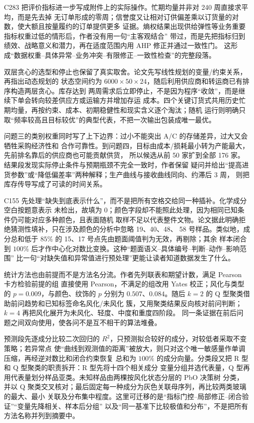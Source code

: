 \documentclass[UTF8,a4paper,12pt]{ctexart}
\begin{document}
C283 把评价指标进一步写成附件上的实际操作。忙期均量并非对 240 周直接求平均，而是先去掉
无订单形成的零周；信誉度又让相对订供偏差乘以订货量的对数，使大额且按量履约的订单提供更多
证据。熵权结果出现供给弹性等业务重要指标权重过低的情形后，作者没有用一句“主客观结合”
带过，而是先把指标归到绩效、战略意义和潜力，再在适度范围内用 AHP 修正并通过一致性门。
这形成“数据权重--具体异常--业务冲突--有限修正--一致性检查”的完整段落。

双层贪心的选型和停止也保留了真实取舍。论文先写线性规划的变量/约束关系，再指出动态规划的
状态空间约为 $6000\times50\times24$，随后利用供应商和转运商已有排序构造两层贪心。库存达到
两周需求后立即停止，不是因为程序“收敛”，而是继续下单会转向较差供应方或运输方并增加存运
成本。四个关键订货式共用历史忙期均量，再按约束、成本、初期稳健性和现实含义逐个淘汰；随机
运行则明确只取“频率较高且目标较优”的典型代表，不把一次输出包装成唯一最优。

问题三的类别权重同时写了上下边界：过小不能突出 A/C 的存储差异，过大又会牺牲采购经济性和
合作可靠性。到问题四，目标由成本/损耗最小转为产能最大，先前排名靠后的供应商也可能贡献供货，
所以候选从前 50 家扩到全部 176 家。结果段发现实际停止条件与预期瓶颈不完全一致时，作者保留
疑问并给出“提高进货参数”或“降低偏差率”两种解释；生产曲线与接收曲线同向、约滞后 3 周，
则把库存传导写成了可读的时间关系。

C155 先处理“缺失到底表示什么”，而不是把所有空格交给同一种插补。化学成分空白按题意表示
未检出，故填为 0；颜色字段却不能照此处理，因为相同已知条件仍可能对应多种颜色，且表面随机
取样不足以代表整件文物。论文据此明确拒绝猜测性填补，只在涉及颜色的分析中忽略 19、40、48、
58 号样品。类似地，成分总和低于 $85\%$ 的 15、17 号点先由题面阈值判为无效，再剔除；其余
样本闭合到 $100\%$ 后才作中心化对数比变换。这种“题面语义--具体编号--判断--动作--影响范围”
比一句“对缺失值和异常值进行预处理”更能让读者知道数据发生了什么。

统计方法也由前提而不是方法名分流。作者先列联表和期望计数，满足 Pearson 卡方检验前提的组
直接使用 Pearson，不满足的组改用 Yates 校正；风化与类型的 $p=0.009$，与颜色、纹饰的
$p$ 分别为 $0.507$、$0.084$。随后 $k=2$ 的 Q 型聚类借助前问趋势和已知标签命名风化/未风化
簇，又用聚类结果反向核对前问判断；$k=4$ 再把风化展开为未风化、轻度、中度和重度四阶段。
同一条证据在前后问题之间双向使用，使各问不是互不相干的算法堆叠。

预测段先逐成分比较二次回归的 $R^2$，只预测拟合较好的成分，对较低者采取不变策略；若异常点
使“曲线到观测值的距离”被放大，则只对这个唯一敏感量作单调压缩，再经逆对数比和闭合约束恢复
总和为 $100\%$ 的成分向量。分类段又把 R 型和 Q 型聚类的职责拆开：R 型先将十四个相关成分
变量分组并选代表量，Q 型再用代表量划分样品亚类。未知样品由两棵按风化状态分层的 PbO 决策树
分类，并以 Q 聚类交叉核对；最后固定每一种成分为灰色关联母序列，再比较两类玻璃的最大、最小
关联及分布集中程度。这里可迁移的是“指标门控--局部修正--闭合验证”“变量先降相关、样本后分组”
以及“同一基准下比较极值和分布”，不是把所有方法名称并列到摘要中。
\end{document}
